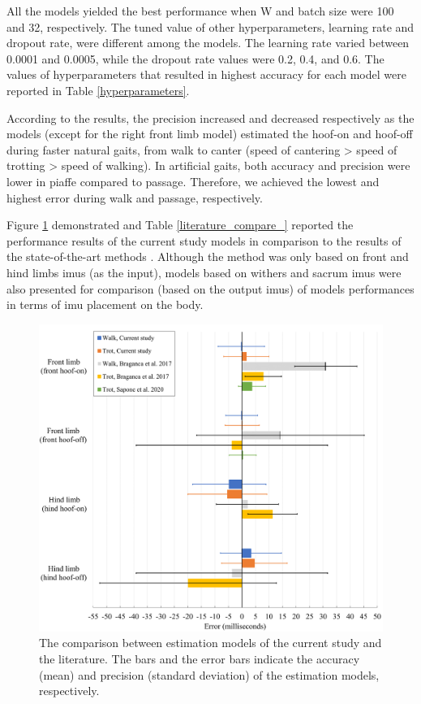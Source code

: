 All the models yielded the best performance when W and batch size were 100 and 32, respectively. The tuned value of other hyperparameters, learning rate and dropout rate, were different among the models. The learning rate varied between 0.0001 and 0.0005, while the dropout rate values were 0.2, 0.4, and 0.6. The values of hyperparameters that resulted in highest accuracy for each model were reported in Table \ref{hyperparameters}.



According to the results, the precision increased and decreased respectively as the models (except for the right front limb model) estimated the hoof-on and hoof-off during faster natural gaits, from walk to canter (speed of cantering > speed of trotting > speed of walking). In artificial gaits, both accuracy and precision were lower in piaffe compared to passage. Therefore, we achieved the lowest and highest error during walk and passage, respectively.

Figure \ref{literature_compare_fig} demonstrated and Table \ref{literature_compare_} reported the performance results of the current study models in comparison to the results of the state-of-the-art methods \cite{adsd1,sapone_2020_comparison}. Although the method was only based on front and hind limbs \gls{imu}s (as the input), models based on withers and sacrum \gls{imu}s were also presented for comparison (based on the output \gls{imu}s) of models performances in terms of \gls{imu} placement on the body.






\begin{figure}[htbp]
\centering
\includegraphics[width=.95\linewidth]{chapters/Step/figures/Studies_step.png}
\caption{The comparison between estimation models of the current study and the literature. The bars and the error bars indicate the accuracy (mean) and precision (standard deviation) of the estimation models, respectively.}
\label{literature_compare_fig}
\end{figure}

